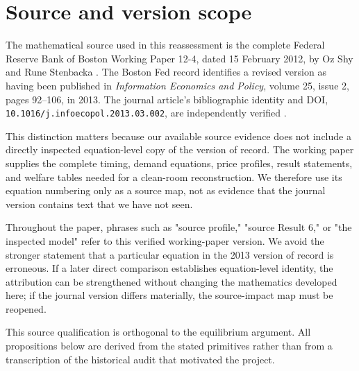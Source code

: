 \section{Source and version scope}\label{sec:source}

The mathematical source used in this reassessment is the complete Federal Reserve Bank of Boston Working Paper 12-4, dated 15 February 2012, by Oz Shy and Rune Stenbacka \citep{ShyStenbacka2012}. The Boston Fed record identifies a revised version as having been published in \emph{Information Economics and Policy}, volume 25, issue 2, pages 92--106, in 2013. The journal article's bibliographic identity and DOI, \texttt{10.1016/j.infoecopol.2013.03.002}, are independently verified \citep{ShyStenbacka2013}.

This distinction matters because our available source evidence does not include a directly inspected equation-level copy of the version of record. The working paper supplies the complete timing, demand equations, price profiles, result statements, and welfare tables needed for a clean-room reconstruction. We therefore use its equation numbering only as a source map, not as evidence that the journal version contains text that we have not seen.

Throughout the paper, phrases such as "source profile," "source Result 6," or "the inspected model" refer to this verified working-paper version. We avoid the stronger statement that a particular equation in the 2013 version of record is erroneous. If a later direct comparison establishes equation-level identity, the attribution can be strengthened without changing the mathematics developed here; if the journal version differs materially, the source-impact map must be reopened.

This source qualification is orthogonal to the equilibrium argument. All propositions below are derived from the stated primitives rather than from a transcription of the historical audit that motivated the project.

